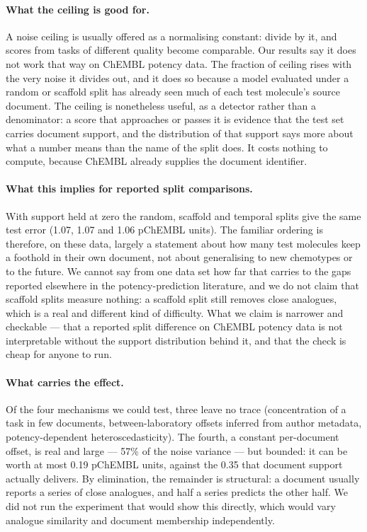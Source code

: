 \paragraph{What the ceiling is good for.} A noise ceiling is usually offered as a normalising constant: divide by it, and scores from tasks of different quality become comparable. Our results say it does not work that way on ChEMBL potency data. The fraction of ceiling rises with the very noise it divides out, and it does so because a model evaluated under a random or scaffold split has already seen much of each test molecule's source document. The ceiling is nonetheless useful, as a detector rather than a denominator: a score that approaches or passes it is evidence that the test set carries document support, and the distribution of that support says more about what a number means than the name of the split does. It costs nothing to compute, because ChEMBL already supplies the document identifier.

\paragraph{What this implies for reported split comparisons.} With support held at zero the random, scaffold and temporal splits give the same test error (1.07, 1.07 and 1.06 pChEMBL units). The familiar ordering is therefore, on these data, largely a statement about how many test molecules keep a foothold in their own document, not about generalising to new chemotypes or to the future. We cannot say from one data set how far that carries to the gaps reported elsewhere in the potency-prediction literature, and we do not claim that scaffold splits measure nothing: a scaffold split still removes close analogues, which is a real and different kind of difficulty. What we claim is narrower and checkable --- that a reported split difference on ChEMBL potency data is not interpretable without the support distribution behind it, and that the check is cheap for anyone to run.

\paragraph{What carries the effect.} Of the four mechanisms we could test, three leave no trace (concentration of a task in few documents, between-laboratory offsets inferred from author metadata, potency-dependent heteroscedasticity). The fourth, a constant per-document offset, is real and large --- 57\% of the noise variance --- but bounded: it can be worth at most 0.19 pChEMBL units, against the 0.35 that document support actually delivers. By elimination, the remainder is structural: a document usually reports a series of close analogues, and half a series predicts the other half. We did not run the experiment that would show this directly, which would vary analogue similarity and document membership independently.


